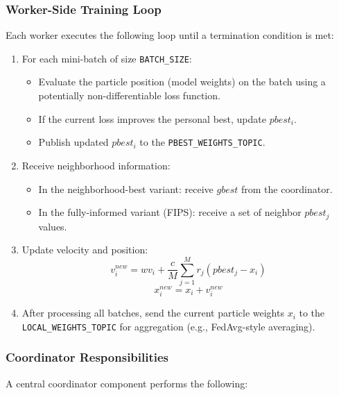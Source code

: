 \subsubsection{Worker-Side Training Loop}

Each worker executes the following loop until a termination condition is met:

\begin{enumerate}
    \item For each mini-batch of size \texttt{BATCH\_SIZE}:
    \begin{itemize}
        \item Evaluate the particle position (model weights) on the batch using a potentially non-differentiable loss function.
        \item If the current loss improves the personal best, update $pbest_i$.
        \item Publish updated $pbest_i$ to the \texttt{PBEST\_WEIGHTS\_TOPIC}.
    \end{itemize}

    \item Receive neighborhood information:
    \begin{itemize}
        \item In the neighborhood-best variant: receive $gbest$ from the coordinator.
        \item In the fully-informed variant (FIPS): receive a set of neighbor $pbest_j$ values.
    \end{itemize}

    \item Update velocity and position:
    \[
    v_i^{new} = w v_i + \frac{c}{M} \sum_{j=1}^{M} r_j (pbest_j - x_i)
    \]
    \[
    x_i^{new} = x_i + v_i^{new}
    \]

    \item After processing all batches, send the current particle weights $x_i$ to the \texttt{LOCAL\_WEIGHTS\_TOPIC} for aggregation (e.g., FedAvg-style averaging).
\end{enumerate}

\subsubsection{Coordinator Responsibilities}

A central coordinator component performs the following:

